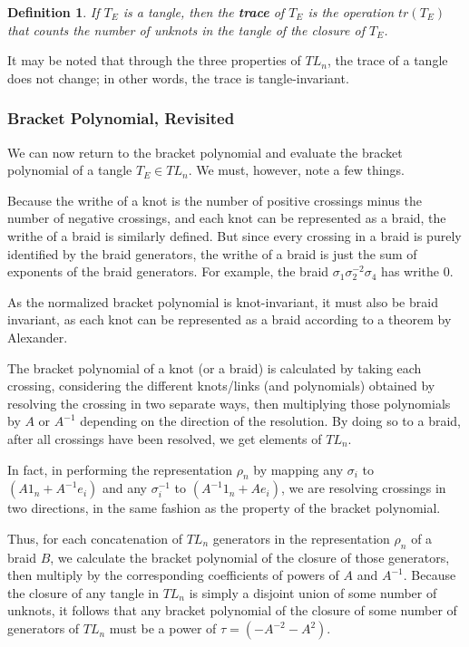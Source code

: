\documentclass[12pt]{article}
\newtheorem{definition}{Definition}[section]
\begin{document}
   \begin{definition}
   If $T_E$ is a tangle, then the \textbf{trace} of $T_E$ is the operation $tr(T_E)$ that counts the number of unknots in the tangle of the closure of $T_E$. 
   \end{definition}

	It may be noted that through the three properties of $TL_n$, the trace of a tangle does not change; in other words, the trace is tangle-invariant. 
    
\subsubsection{Bracket Polynomial, Revisited}

We can now return to the bracket polynomial and evaluate the bracket polynomial of a tangle $T_E \in TL_n$. We must, however, note a few things. 

Because the writhe of a knot is the number of positive crossings minus the number of negative crossings, and each knot can be represented as a braid, the writhe of a braid is similarly defined. But since every crossing in a braid is purely identified by the braid generators, the writhe of a braid is just the sum of exponents of the braid generators. For example, the braid $\sigma_1 \sigma_2^{-2} \sigma_4$ has writhe 0. 

As the normalized bracket polynomial is knot-invariant, it must also be braid invariant, as each knot can be represented as a braid according to a theorem by Alexander. 

The bracket polynomial of a knot (or a braid) is calculated by taking each crossing, considering the different knots/links (and polynomials) obtained by resolving the crossing in two separate ways, then multiplying those polynomials by $A$ or $A^{-1}$ depending on the direction of the resolution. By doing so to a braid, after all crossings have been resolved, we get elements of $TL_n$. 

In fact, in performing the representation $\rho_n$ by mapping any $\sigma_i$ to $(A 1_n  + A^{-1}e_i)$ and any $\sigma_i^{-1}$ to $(A^{-1}1_n  + A e_i)$, we are resolving crossings in two directions, in the same fashion as the property of the bracket polynomial. 

Thus, for each concatenation of $TL_n$ generators in the representation $\rho_n$ of a braid $B$, we calculate the bracket polynomial of the closure of those generators, then multiply by the corresponding coefficients of powers of $A$ and $A^{-1}$. Because the closure of any tangle in $TL_n$ is simply a disjoint union of some number of unknots, it follows that any bracket polynomial of the closure of some number of generators of $TL_n$ must be a power of $\tau = (-A^{-2} - A^{2})$.
\end{document}
